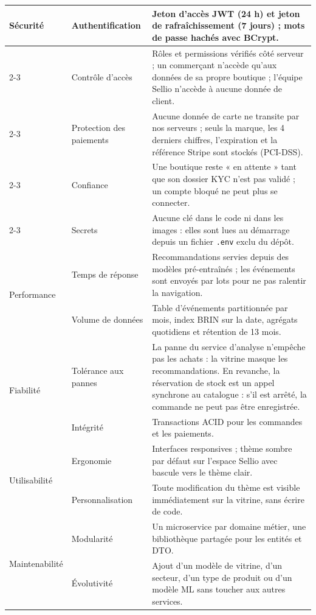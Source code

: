 \begin{longtable}{|p{3.2cm}|p{4cm}|p{8cm}|}
\multirow{5}{*}{Sécurité} & Authentification & Jeton d'accès JWT (24 h) et jeton de rafraîchissement (7 jours) ; mots de passe hachés avec BCrypt. \\
\cline{2-3}
 & Contrôle d'accès & Rôles et permissions vérifiés côté serveur ; un commerçant n'accède qu'aux données de sa propre boutique ; l'équipe Sellio n'accède à aucune donnée de client. \\
\cline{2-3}
 & Protection des paiements & Aucune donnée de carte ne transite par nos serveurs ; seuls la marque, les 4 derniers chiffres, l'expiration et la référence Stripe sont stockés (PCI-DSS). \\
\cline{2-3}
 & Confiance & Une boutique reste « en attente » tant que son dossier KYC n'est pas validé ; un compte bloqué ne peut plus se connecter. \\
\cline{2-3}
 & Secrets & Aucune clé dans le code ni dans les images : elles sont lues au démarrage depuis un fichier \texttt{.env} exclu du dépôt. \\
\hline
\multirow{2}{*}{Performance} & Temps de réponse & Recommandations servies depuis des modèles pré-entraînés ; les événements sont envoyés par lots pour ne pas ralentir la navigation. \\
\cline{2-3}
 & Volume de données & Table d'événements partitionnée par mois, index BRIN sur la date, agrégats quotidiens et rétention de 13 mois. \\
\hline
\multirow{2}{*}{Fiabilité} & Tolérance aux pannes & La panne du service d'analyse n'empêche pas les achats : la vitrine masque les recommandations. En revanche, la réservation de stock est un appel synchrone au catalogue : s'il est arrêté, la commande ne peut pas être enregistrée. \\
\cline{2-3}
 & Intégrité & Transactions ACID pour les commandes et les paiements. \\
\hline
\multirow{2}{*}{Utilisabilité} & Ergonomie & Interfaces responsives ; thème sombre par défaut sur l'espace Sellio avec bascule vers le thème clair. \\
\cline{2-3}
 & Personnalisation & Toute modification du thème est visible immédiatement sur la vitrine, sans écrire de code. \\
\hline
\multirow{3}{*}{Maintenabilité} & Modularité & Un microservice par domaine métier, une bibliothèque partagée pour les entités et DTO. \\
\cline{2-3}
 & Évolutivité & Ajout d'un modèle de vitrine, d'un secteur, d'un type de produit ou d'un modèle ML sans toucher aux autres services. \\

\end{longtable}
